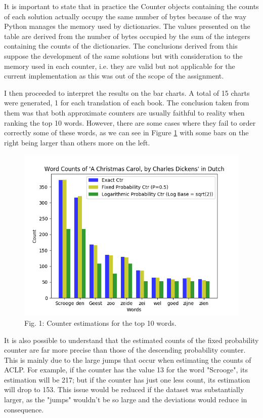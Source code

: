 \documentclass[shortpaper]{revdetua}
\begin{document}
It is important to state that in practice the Counter objects containing the 
counts of each solution actually occupy the same number of bytes because of the 
way Python manages the memory used by dictionaries.
The values presented on the table are derived from the number of bytes occupied 
by the sum of the integers containing the counts of the dictionaries.
The conclusions derived from this suppose the development of the same solutions 
but with consideration to the memory used in each counter, i.e. they are valid 
but not applicable for the current implementation as this was out of the scope 
of the assignment.
\newpage

I then proceeded to interpret the results on the bar charts.
A total of 15 charts were generated, 1 for each translation of each book.
The conclusion taken from them was that both approximate counters are usually
faithful to reality when ranking the top 10 words.
However, there are some cases where they fail to order correctly some of these 
words, as we can see in Figure \ref{fig:1} with some bars on the right being 
larger than others more on the left.

\vspace{-10pt}
\captionsetup[figure]{labelformat=empty}
\begin{figure}[H]
    \centering
    \setlength{\belowcaptionskip}{-12pt}
    \includegraphics[width=\linewidth]{wordCount_ACC_DU.png}
    \caption{Fig. 1: Counter estimations for the top 10 words.} 
    \label{fig:1}
\end{figure}

It is also possible to understand that the estimated counts of the fixed 
probability counter are far more precise than those of the descending probability
counter.
This is mainly due to the large jumps that occur when estimating the counts of
ACLP. For example, if the counter has the value 13 for the word "Scrooge", its 
estimation will be 217; but if the counter has just one less count, its estimation 
will drop to 153.
This issue would be reduced if the dataset was substantially larger, as the 
"jumps" wouldn't be so large and the deviations would reduce in consequence.
\newline
\end{document}
